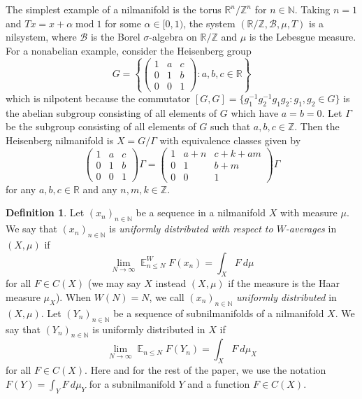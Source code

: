 \documentclass[12pt]{article}
\theoremstyle{plain} %
\theoremstyle{definition} %
\newtheorem{definition}[theorem]{Definition}
\theoremstyle{plain}
\theoremstyle{plain}
\numberwithin{equation}{section}
\newcommand{\N}{\mathbb{N}}
\newcommand{\Z}{\mathbb{Z}}
\newcommand{\R}{\mathbb{R}}
\renewcommand{\leq}{\leqslant}
\newcommand{\1}{\mathbbm{1}}
\newcommand{\E}{\operatorname{\mathbb{E}}}
\newcommand{\oo}{\infty}
\renewcommand{\mod}{\operatorname{mod}}
\begin{document}
    The simplest example of a nilmanifold is the torus $\R^n/\Z^n$ for $n\in \N$. Taking $n=1$ and $Tx=x+\alpha\mod 1$ for some $\alpha \in [0,1)$, the system $(\mathbb{R}/\mathbb{Z},\mathscr{B},\mu,T)$ is a nilsystem, where $\mathscr{B}$ is the Borel $\sigma$-algebra on $\R/\Z$ and $\mu$ is the Lebesgue measure. For a nonabelian example, consider the Heisenberg group
    \begin{equation*}
        G = \left\{
        \begin{pmatrix}
            1 & a & c\\
            0 & 1 & b\\
            0 & 0 & 1
        \end{pmatrix}:a,b,c\in \R\right\}
    \end{equation*}
    which is nilpotent because the commutator 
    $[G,G] = \{g_1^{-1}g_2^{-1}g_1g_2:g_1,g_2\in G\}$ is the abelian subgroup consisting of all elements of $G$ which have $a=b=0$. Let $\Gamma$ be the subgroup consisting of all elements of $G$ such that $a,b,c\in \Z$. Then the Heisenberg nilmanifold is $X = G/\Gamma$ with equivalence classes given by 
    \begin{equation*}
         \begin{pmatrix}
            1 & a & c\\
            0 & 1 & b\\
            0 & 0 & 1
        \end{pmatrix}\Gamma =  \begin{pmatrix}
            1 & a+n & c+k+am\\
            0 & 1 & b+m\\
            0 & 0 & 1
        \end{pmatrix}\Gamma
    \end{equation*}
    for any $a,b,c\in \R$ and any $n,m,k\in \Z$.
\begin{definition}\label{def:u.d.}
 Let $(x_n)_{n\in \N}$ be a sequence in a nilmanifold $X$ with measure $\mu$. We say that $(x_n)_{n\in \N}$ is \emph{uniformly distributed with respect to $W$-averages} in $(X,\mu)$ if 
 \begin{equation}
          \lim_{N\to\oo}\E^W_{n\leq N}F(x_n) = \int_X F~d\mu
 \end{equation}
 for all $F\in C(X)$ (we may say $X$ instead $(X,\mu)$ if the measure is the Haar measure $\mu_X$). When $W(N)=N$, we call $(x_n)_{n\in \N}$ \emph{uniformly distributed} in $(X,\mu)$. Let $(Y_n)_{n\in \N}$ be a sequence of subnilmanifolds of a nilmanifold $X$. We say that $(Y_n)_{n\in \N}$ is uniformly distributed in $X$ if 
  \begin{equation}
          \lim_{N\to\oo}\E_{n\leq N}F(Y_n) = \int_X F~d\mu_X
 \end{equation}
 for all $F\in C(X)$. Here and for the rest of the paper, we use the notation $F(Y) =\int_Y F~d\mu_Y$ for a subnilmanifold $Y$ and a function $F\in C(X)$.
\end{definition}
\end{document}
